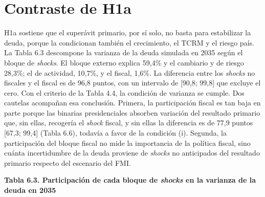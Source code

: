 \section{Contraste de H1a}

H1a sostiene que el superávit primario, por sí solo, no basta para
estabilizar la deuda, porque la condicionan también el crecimiento, el
TCRM y el riesgo país. La Tabla 6.3 descompone la varianza de la deuda
simulada en 2035 según el bloque de \emph{shocks}. El bloque externo
explica 59,4\% y el cambiario y de riesgo 28,3\%; el de actividad,
10,7\%, y el fiscal, 1,6\%. La diferencia entre los \emph{shocks} no
fiscales y el fiscal es de 96,8 puntos, con un intervalo de {[}90,8;
99,8{]} que excluye el cero. Con el criterio de la Tabla 4.4, la
condición de varianza se cumple. Dos cautelas acompañan esa conclusión.
Primera, la participación fiscal es tan baja en parte porque las
binarias presidenciales absorben variación del resultado primario que,
sin ellas, recogería el \emph{shock} fiscal, y sin ellas la diferencia
es de 77,9 puntos {[}67,3; 99,4{]} (Tabla 6.6), todavía a favor de la
condición (i). Segunda, la participación del bloque fiscal no mide la
importancia de la política fiscal, sino cuánta incertidumbre de la deuda
proviene de \emph{shocks} no anticipados del resultado primario respecto
del escenario del FMI.

\textbf{Tabla 6.3. Participación de cada bloque de \emph{shocks} en la
varianza de la deuda en 2035}

